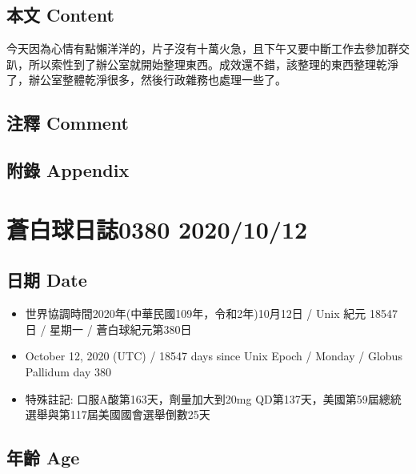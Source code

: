 \documentclass[
]{article}
\providecommand{\tightlist}{%
  \setlength{\itemsep}{0pt}\setlength{\parskip}{0pt}}
\begin{document}
\hypertarget{ux672cux6587-content-9}{%
\subsection{本文 Content}\label{ux672cux6587-content-9}}

今天因為心情有點懶洋洋的，片子沒有十萬火急，且下午又要中斷工作去參加群交趴，所以索性到了辦公室就開始整理東西。成效還不錯，該整理的東西整理乾淨了，辦公室整體乾淨很多，然後行政雜務也處理一些了。

\hypertarget{ux6ce8ux91cb-comment-9}{%
\subsection{注釋 Comment}\label{ux6ce8ux91cb-comment-9}}

\hypertarget{ux9644ux9304-appendix-9}{%
\subsection{附錄 Appendix}\label{ux9644ux9304-appendix-9}}

\hypertarget{ux84bcux767dux7403ux65e5ux8a8c0380-20201012}{%
\section{蒼白球日誌0380
2020/10/12}\label{ux84bcux767dux7403ux65e5ux8a8c0380-20201012}}

\hypertarget{ux65e5ux671f-date-10}{%
\subsection{日期 Date}\label{ux65e5ux671f-date-10}}

\begin{itemize}
\tightlist
\item
  世界協調時間2020年(中華民國109年，令和2年)10月12日 / Unix 紀元 18547
  日 / 星期一 / 蒼白球紀元第380日
\item
  October 12, 2020 (UTC) / 18547 days since Unix Epoch / Monday / Globus
  Pallidum day 380
\item
  特殊註記: 口服A酸第163天，劑量加大到20mg
  QD第137天，美國第59屆總統選舉與第117屆美國國會選舉倒數25天
\end{itemize}

\hypertarget{ux5e74ux9f61-age-10}{%
\subsection{年齡 Age}\label{ux5e74ux9f61-age-10}}
\end{document}

